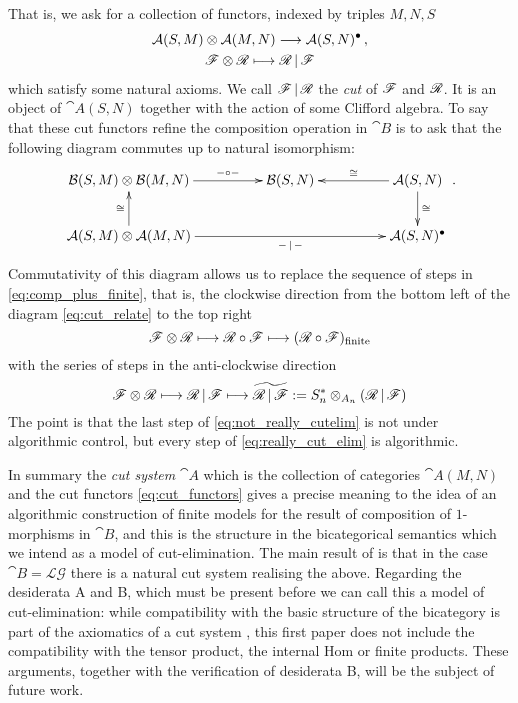 \documentclass[english,letter paper,12pt,reqno]{article}
\theoremstyle{example}
\numberwithin{equation}{section}
\def\LG{\mathcal{LG}}
\begin{document}
That is, we ask for a collection of functors, indexed by triples $M,N,S$
\begin{gather}\label{eq:cut_functors}
\mathcal{A}(S,M) \otimes \mathcal{A}(M,N) \longrightarrow \mathcal{A}(S,N)^\bullet\,,\\
\mathscr{F} \otimes \mathscr{R} \longmapsto \mathscr{R} \,|\, \mathscr{F}
\end{gather}
which satisfy some natural axioms. We call $\mathscr{F} \,|\, \mathscr{R}$ the \emph{cut} of $\mathscr{F}$ and $\mathscr{R}$. It is an object of $\cat{A}(S,N)$ together with the action of some Clifford algebra. To say that these cut functors refine the composition operation in $\cat{B}$ is to ask that the following diagram commutes up to natural isomorphism:
\begin{equation}\label{eq:cut_relate}
\xymatrix@C+2pc{
\cat{B}(S,M) \otimes \cat{B}(M,N) \ar[r]^-{- \circ -} & \cat{B}(S,N) & \cat{A}(S,N) \ar[l]_-{\cong} \ar[d]^-{\cong}\\
\cat{A}(S,M) \otimes \cat{A}(M,N) \ar[u]^-{\cong} \ar[rr]_-{- \l -} & & \cat{A}(S,N)^\bullet
}\,.
\end{equation}
Commutativity of this diagram allows us to replace the sequence of steps in \eqref{eq:comp_plus_finite}, that is, the clockwise direction from the bottom left of the diagram \eqref{eq:cut_relate} to the top right
\begin{equation}\label{eq:not_really_cutelim}
\mathscr{F} \otimes \mathscr{R} \longmapsto \mathscr{R} \circ \mathscr{F} \longmapsto (\mathscr{R} \circ \mathscr{F})_{\operatorname{finite}}
\end{equation}
with the series of steps in the anti-clockwise direction
\begin{equation}\label{eq:really_cut_elim}
\mathscr{F} \otimes \mathscr{R} \longmapsto \mathscr{R} \,|\, \mathscr{F} \longmapsto \widetilde{ \mathscr{R} \,|\, \mathscr{F} } := S_n^* \otimes_{A_n} ( \mathscr{R} \,|\, \mathscr{F} )
\end{equation}
The point is that the last step of \eqref{eq:not_really_cutelim} is not under algorithmic control, but every step of \eqref{eq:really_cut_elim} is algorithmic.

In summary the \emph{cut system} $\cat{A}$ which is the collection of categories $\cat{A}(M,N)$ and the cut functors \eqref{eq:cut_functors} gives a precise meaning to the idea of an algorithmic construction of finite models for the result of composition of $1$-morphisms in $\cat{B}$, and this is the structure in the bicategorical semantics which we intend as a model of cut-elimination. The main result of \cite{murfet} is that in the case $\cat{B} = \LG$ there is a natural cut system realising the above. Regarding the desiderata A and B, which must be present before we can call this a model of cut-elimination: while compatibility with the basic structure of the bicategory is part of the axiomatics of a cut system \cite[\S 3]{murfet}, this first paper does not include the compatibility with the tensor product, the internal Hom or finite products. These arguments, together with the verification of desiderata B, will be the subject of future work.
\end{document}
